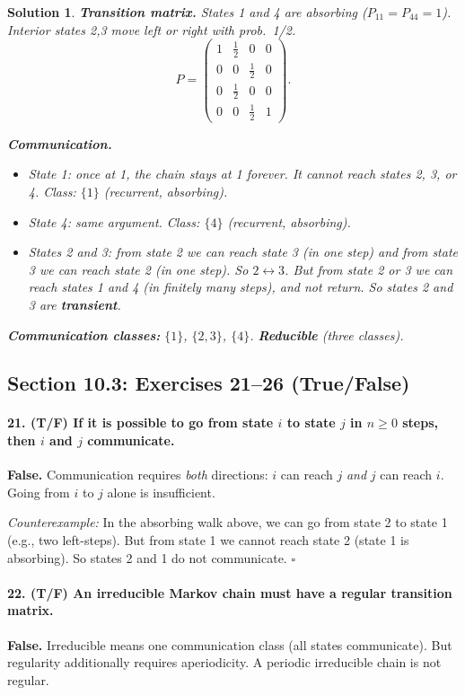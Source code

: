 \documentclass[11pt,a4paper]{article}
\theoremstyle{sol}
\newtheorem*{solution}{Solution}
\begin{document}
\begin{solution}
\textbf{Transition matrix.} States 1 and 4 are absorbing ($P_{11}=P_{44}=1$). Interior states 2,3 move left or right with prob.\ 1/2.
\[
P = \begin{pmatrix}1&\frac12&0&0\\0&0&\frac12&0\\0&\frac12&0&0\\0&0&\frac12&1\end{pmatrix}.
\]

\textbf{Communication.}
\begin{itemize}
  \item State 1: once at 1, the chain stays at 1 forever. It cannot reach states 2, 3, or 4. Class: $\{1\}$ (recurrent, absorbing).
  \item State 4: same argument. Class: $\{4\}$ (recurrent, absorbing).
  \item States 2 and 3: from state 2 we can reach state 3 (in one step) and from state 3 we can reach state 2 (in one step). So $2\leftrightarrow3$. But from state 2 or 3 we can reach states 1 and 4 (in finitely many steps), and \emph{not} return. So states 2 and 3 are \textbf{transient}.
\end{itemize}

\textbf{Communication classes:} $\{1\}$, $\{2,3\}$, $\{4\}$. \textbf{Reducible} (three classes).
\end{solution}

\clearpage
\subsection{Section 10.3: Exercises 21--26 (True/False)}

\paragraph{21. (T/F) If it is possible to go from state $i$ to state $j$ in $n\geq0$ steps, then $i$ and $j$ communicate.}
\textbf{False.} Communication requires \emph{both} directions: $i$ can reach $j$ \emph{and} $j$ can reach $i$. Going from $i$ to $j$ alone is insufficient.

\textit{Counterexample:} In the absorbing walk above, we can go from state 2 to state 1 (e.g., two left-steps). But from state 1 we cannot reach state 2 (state 1 is absorbing). So states 2 and 1 do not communicate. $\square$

\paragraph{22. (T/F) An irreducible Markov chain must have a regular transition matrix.}
\textbf{False.} Irreducible means one communication class (all states communicate). But regularity additionally requires aperiodicity. A periodic irreducible chain is not regular.
\end{document}
